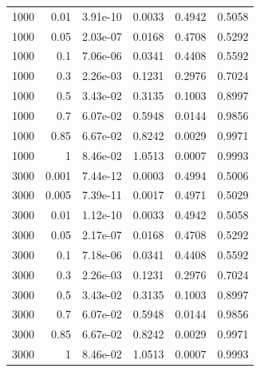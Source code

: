 {\begin{longtable}{rrrrrr}
1000 & 0.01 & 3.91e-10 & 0.0033 & 0.4942 & 0.5058 \\
1000 & 0.05 & 2.03e-07 & 0.0168 & 0.4708 & 0.5292 \\
1000 & 0.1 & 7.06e-06 & 0.0341 & 0.4408 & 0.5592 \\
1000 & 0.3 & 2.26e-03 & 0.1231 & 0.2976 & 0.7024 \\
1000 & 0.5 & 3.43e-02 & 0.3135 & 0.1003 & 0.8997 \\
1000 & 0.7 & 6.07e-02 & 0.5948 & 0.0144 & 0.9856 \\
1000 & 0.85 & 6.67e-02 & 0.8242 & 0.0029 & 0.9971 \\
1000 & 1 & 8.46e-02 & 1.0513 & 0.0007 & 0.9993 \\
3000 & 0.001 & 7.44e-12 & 0.0003 & 0.4994 & 0.5006 \\
3000 & 0.005 & 7.39e-11 & 0.0017 & 0.4971 & 0.5029 \\
3000 & 0.01 & 1.12e-10 & 0.0033 & 0.4942 & 0.5058 \\
3000 & 0.05 & 2.17e-07 & 0.0168 & 0.4708 & 0.5292 \\
3000 & 0.1 & 7.18e-06 & 0.0341 & 0.4408 & 0.5592 \\
3000 & 0.3 & 2.26e-03 & 0.1231 & 0.2976 & 0.7024 \\
3000 & 0.5 & 3.43e-02 & 0.3135 & 0.1003 & 0.8997 \\
3000 & 0.7 & 6.07e-02 & 0.5948 & 0.0144 & 0.9856 \\
3000 & 0.85 & 6.67e-02 & 0.8242 & 0.0029 & 0.9971 \\
3000 & 1 & 8.46e-02 & 1.0513 & 0.0007 & 0.9993 \\
\bottomrule
\end{longtable}}

